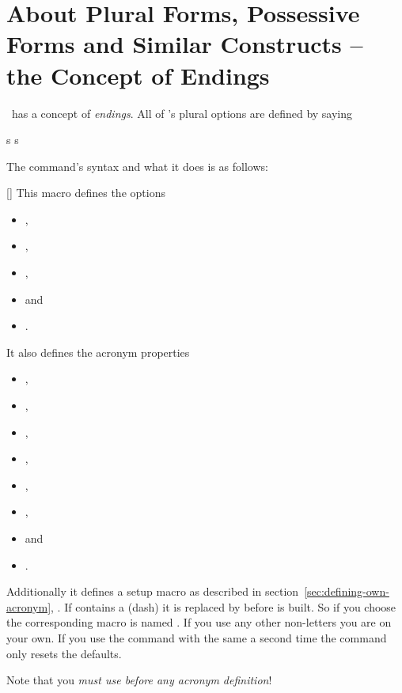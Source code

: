 \documentclass{acro-manual}
\begin{document}
\section{About Plural Forms, Possessive Forms and Similar Constructs -- the
  Concept of Endings}\label{sec:about-plural-forms}

\acro\ has a concept of \emph{endings}.  All of \acro's plural options are
defined by saying
\begin{sourcecode}
   {s} {s}
\end{sourcecode}
The command's syntax and what it does is as follows:
\begin{commands}
  []
    This macro defines the options
    \begin{itemize}
      \item {},
      \item {},
      \item {},
      \item {} and
      \item {}.
    \end{itemize}
    It also defines the acronym properties
    \begin{itemize}
      \item {},
      \item {},
      \item {},
      \item {},
      \item {},
      \item {},
      \item {} and
      \item {}.
    \end{itemize}
    Additionally it defines a setup macro as
    described in section~\vref{sec:defining-own-acronym},
    .  If  contains a \code{-} (dash) it is
    replaced by \code{\_} before  is built.  So if you
    choose  the corresponding macro is named
    .  If you use any other non-letters you are on your
    own. If you use the command with the same 
    a second time the command only resets the defaults.

    Note that you \emph{must use  before any acronym
      definition}!
\end{commands}
\end{document}
